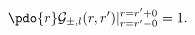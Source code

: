 \begin{equation}
\label{Eq_0218}
\pdo{r} \mathcal{G}_{\pm,l}(r, r')
	|^{r = r' + 0}_{r = r' - 0} = 1.
\end{equation}

